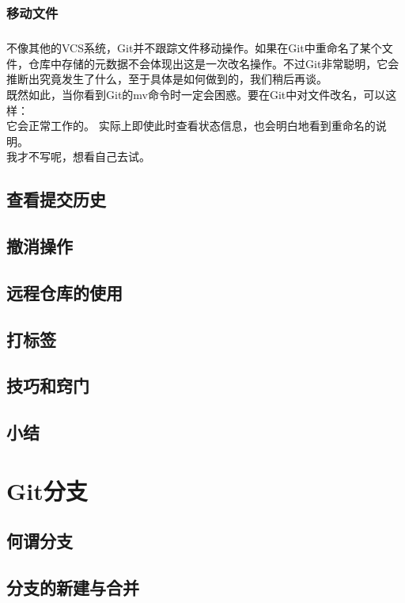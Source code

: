 \documentclass{book}
\begin{document}
	\subsection{移动文件}
	\paragraph{}
	不像其他的VCS系统，Git并不跟踪文件移动操作。如果在Git中重命名了某个文件，仓库中存储的元数据不会体现出这是一次改名操作。不过Git非常聪明，它会推断出究竟发生了什么，至于具体是如何做到的，我们稍后再谈。\\
	既然如此，当你看到Git的mv命令时一定会困惑。要在Git中对文件改名，可以这样：\\
	它会正常工作的。 实际上即使此时查看状态信息，也会明白地看到重命名的说明。\\
	我才不写呢，想看自己去试。\\

	\section{查看提交历史}
	\section{撤消操作}
	\section{远程仓库的使用}
	\section{打标签}
	\section{技巧和窍门}
	\section{小结}

\chapter{Git分支}

	\section{何谓分支}
	\section{分支的新建与合并}
\end{document}
